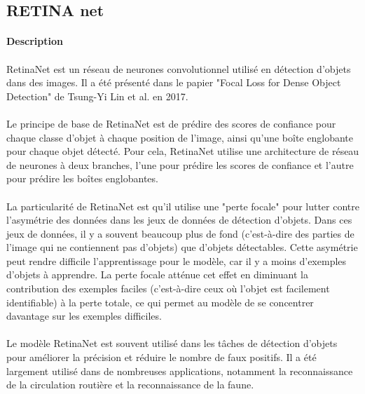 
\subsection{RETINA net}

\paragraph{Description}

\paragraph{} RetinaNet est un réseau de neurones convolutionnel utilisé en détection d'objets dans des images. Il a été présenté dans le papier "Focal Loss for Dense Object Detection" de Tsung-Yi Lin et al. en 2017.

\paragraph{} Le principe de base de RetinaNet est de prédire des scores de confiance pour chaque classe d'objet à chaque position de l'image, ainsi qu'une boîte englobante pour chaque objet détecté. Pour cela, RetinaNet utilise une architecture de réseau de neurones à deux branches, l'une pour prédire les scores de confiance et l'autre pour prédire les boîtes englobantes.

\paragraph{} La particularité de RetinaNet est qu'il utilise une "perte focale" pour lutter contre l'asymétrie des données dans les jeux de données de détection d'objets. Dans ces jeux de données, il y a souvent beaucoup plus de fond (c'est-à-dire des parties de l'image qui ne contiennent pas d'objets) que d'objets détectables. Cette asymétrie peut rendre difficile l'apprentissage pour le modèle, car il y a moins d'exemples d'objets à apprendre. La perte focale atténue cet effet en diminuant la contribution des exemples faciles (c'est-à-dire ceux où l'objet est facilement identifiable) à la perte totale, ce qui permet au modèle de se concentrer davantage sur les exemples difficiles.

\paragraph{} Le modèle RetinaNet est souvent utilisé dans les tâches de détection d'objets pour améliorer la précision et réduire le nombre de faux positifs. Il a été largement utilisé dans de nombreuses applications, notamment la reconnaissance de la circulation routière et la reconnaissance de la faune.

